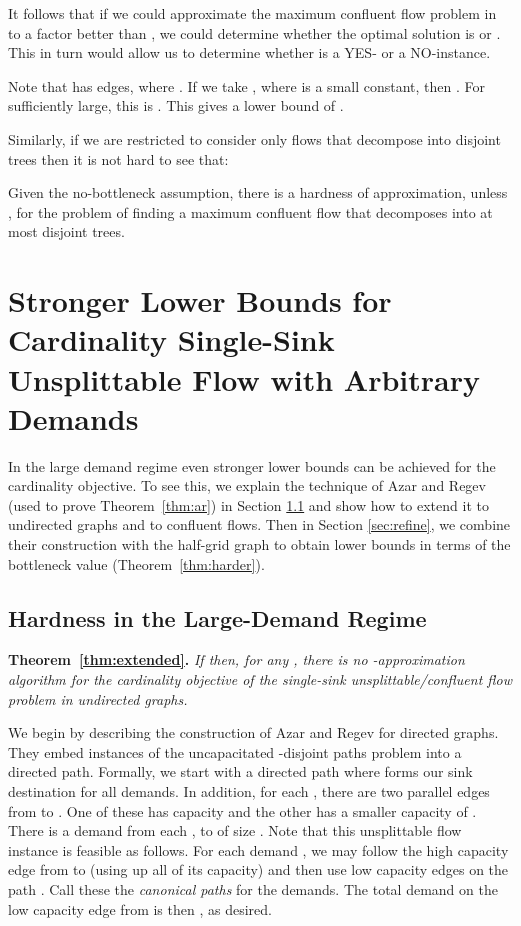\documentclass[12pt]{article}
\newcommand{\qed}{}
\begin{document}
  It follows that if we could
approximate the maximum confluent flow problem in  to a
factor better than , we could determine whether the optimal solution is
 or . This in turn would allow us to determine whether  is a YES-
or a NO-instance.

Note that  has  edges, where . If we
take , where  is a
small constant, then . For  sufficiently large,
this is .  This gives a
lower bound of .  \qed

Similarly, if we are restricted to consider only flows that decompose into 
disjoint trees then it is not hard to see that:
\begin{thm}
Given the no-bottleneck assumption, there is a  hardness of
approximation, unless , for the problem of finding a maximum confluent flow that
decomposes into at most  disjoint trees. \qed
\end{thm}








\section{Stronger Lower Bounds for Cardinality Single-Sink Unsplittable Flow with Arbitrary Demands}\label{sec:stronger}

In the large demand regime even stronger lower bounds can be achieved for the cardinality objective.
To see this, we explain the technique of Azar and Regev \cite{azar2001strongly} (used to prove Theorem~\ref{thm:ar})
in Section \ref{sec:expo-demands} and show how to extend it to undirected graphs and to confluent flows.
Then in Section \ref{sec:refine}, we combine their construction with the half-grid graph
to obtain lower bounds in terms of the bottleneck value (Theorem~\ref{thm:harder}).

\subsection{ Hardness in the Large-Demand Regime}\label{sec:expo-demands}



{{\noindent\bf Theorem~\ref{thm:extended}.} \itshape
If  then, for any , there is no -approximation algorithm
for the cardinality objective of the single-sink unsplittable/confluent flow problem in undirected graphs.\\
}

We begin by describing the construction of Azar and Regev for directed graphs.
They embed instances of the uncapacitated -disjoint paths problem into a directed path.
Formally, we start with a directed path   where
   forms our sink destination for all demands. In addition, for each , there are two parallel edges
 from  to . One of these has capacity  and the other has a smaller capacity of .
 There is a demand  from each ,  to  of size .
 Note that this unsplittable flow instance is feasible as follows. For each demand , we may follow the high capacity edge
 from  to  (using up all of its capacity) and then use low capacity edges on the
 path . Call these the {\em canonical paths} for the demands.
The total demand on the low capacity edge from  is then , as desired.
\end{document}
